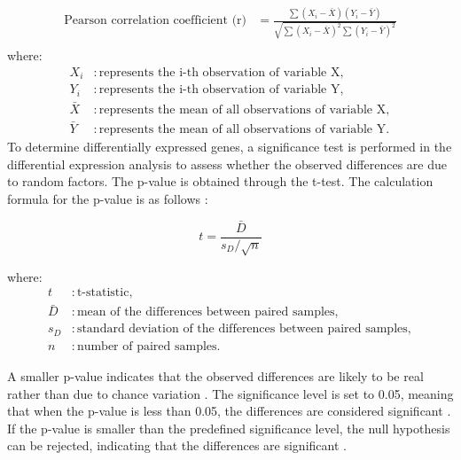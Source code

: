 \documentclass[12pt]{article}
\begin{document}
 \begin{align*}
\text{Pearson correlation coefficient (r)} & = \frac{\sum{(X_i - \bar{X})(Y_i - \bar{Y})}}{\sqrt{\sum{(X_i - \bar{X})^2}\sum{(Y_i - \bar{Y})^2}}} \\
\end{align*}
where:
\begin{align*}
X_i & : \text{represents the i-th observation of variable X}, \\
Y_i & : \text{represents the i-th observation of variable Y}, \\
\bar{X} & : \text{represents the mean of all observations of variable X}, \\
\bar{Y} & : \text{represents the mean of all observations of variable Y}.
\end{align*}
To determine differentially expressed genes, a significance test is performed in the differential expression analysis to assess whether the observed differences are due to random factors. The p-value is obtained through the t-test. 
The calculation formula for the p-value is as follows \citep{ho2019moving}:

\[
t = \frac{\bar{D}}{s_D / \sqrt{n}}
\]

where:
\begin{align*}
t & : \text{t-statistic}, \\
\bar{D} & : \text{mean of the differences between paired samples}, \\
s_D & : \text{standard deviation of the differences between paired samples}, \\
n & : \text{number of paired samples}.
\end{align*}

A smaller p-value indicates that the observed differences are likely to be real rather than due to chance variation \citep{ho2019moving}. The significance level is set to 0.05, meaning that when the p-value is less than 0.05, the differences are considered significant \citep{kim2015t}. If the p-value is smaller than the predefined significance level, the null hypothesis can be rejected, indicating that the differences are significant \citep{ho2019moving}.
\end{document}
